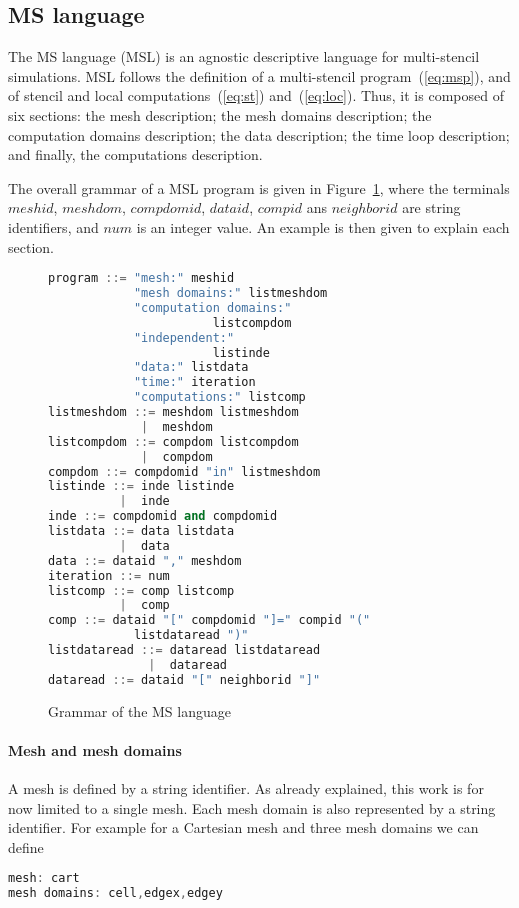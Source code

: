 \subsection{MS language}
The MS language (MSL) is an agnostic descriptive language for multi-stencil simulations. MSL follows the definition of a multi-stencil program~(\ref{eq:msp}), and of stencil and local computations~(\ref{eq:st}) and~(\ref{eq:loc}). Thus, it is composed of six sections: the mesh description; the mesh domains description; the computation domains description; the data description; the time loop description; and finally, the computations description.

The overall grammar of a MSL program is given in Figure~\ref{fig:grammar}, where the terminals $meshid$, $meshdom$, $compdomid$, $dataid$, $compid$ ans $neighborid$ are string identifiers, and $num$ is an integer value. An example is then given to explain each section.

\begin{figure}[h!]
\begin{lstlisting}[basicstyle=\small,mathescape,frame=single,language=C++]
program ::= "mesh:" meshid 
            "mesh domains:" listmeshdom
            "computation domains:" 
                       listcompdom
            "independent:"
                       listinde
            "data:" listdata
            "time:" iteration
            "computations:" listcomp
listmeshdom ::= meshdom listmeshdom
             |  meshdom
listcompdom ::= compdom listcompdom
             |  compdom
compdom ::= compdomid "in" listmeshdom
listinde ::= inde listinde
          |  inde
inde ::= compdomid and compdomid
listdata ::= data listdata
          |  data
data ::= dataid "," meshdom
iteration ::= num
listcomp ::= comp listcomp
          |  comp
comp ::= dataid "[" compdomid "]=" compid "(" 
            listdataread ")"
listdataread ::= dataread listdataread
              |  dataread
dataread ::= dataid "[" neighborid "]"
\end{lstlisting}
\caption{Grammar of the MS language}
\label{fig:grammar}
\end{figure}

\paragraph{Mesh and mesh domains} A mesh is defined by a string identifier. As already explained, this work is for now limited to a single mesh. Each mesh domain is also represented by a string identifier. For example for a Cartesian mesh and three mesh domains we can define
\begin{lstlisting}[basicstyle=\small,mathescape,frame=single,language=C++]
mesh: cart
mesh domains: cell,edgex,edgey
\end{lstlisting}

